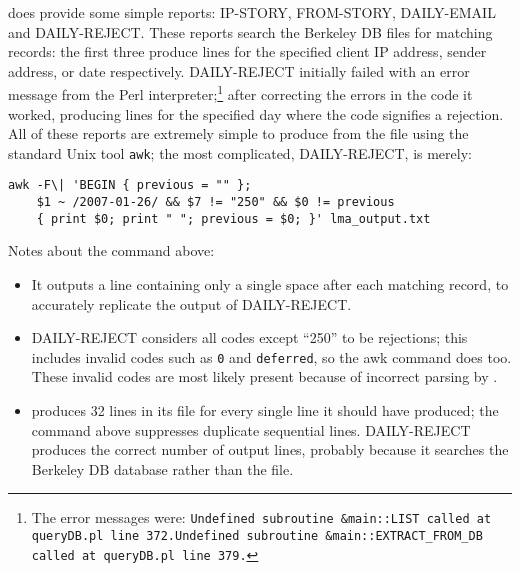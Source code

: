  does provide some simple reports: IP-STORY, FROM-STORY,
DAILY-EMAIL and DAILY-REJECT\@.  These reports search the Berkeley DB files
for matching records: the first three produce  lines for the
specified client IP address, sender address, or date respectively.
DAILY-REJECT initially failed with an error message from the Perl
interpreter;\footnote{The error messages were: \newline{}\texttt{Undefined
subroutine \&main::LIST called at queryDB.pl line
372.}\newline{}\texttt{Undefined subroutine \&main::EXTRACT\_FROM\_DB
called at queryDB.pl line 379.}} after correcting the errors in the code it
worked, producing  lines for the specified day where the
 code signifies a rejection.  All of these reports are
extremely simple to produce from the  file using the standard
Unix tool \texttt{awk}; the most complicated, DAILY-REJECT, is
merely:


\begin{verbatim}
awk -F\| 'BEGIN { previous = "" };
    $1 ~ /2007-01-26/ && $7 != "250" && $0 != previous
    { print $0; print " "; previous = $0; }' lma_output.txt
\end{verbatim}

Notes about the command above:

\begin{itemize}

    \item It outputs a line containing only a single space after each
        matching record, to accurately replicate the output of
        DAILY-REJECT\@.

    \item DAILY-REJECT considers all  codes except ``250'' to
        be rejections; this includes invalid  codes such as
        \texttt{0} and \texttt{deferred}, so the awk command does too.
        These invalid  codes are most likely present because
        of incorrect parsing by .

    \item {} produces 32 lines in its  file for
        every single line it should have produced; the command above
        suppresses duplicate sequential lines.  DAILY-REJECT produces the
        correct number of output lines, probably because it searches the
        Berkeley DB database rather than the  file.

\end{itemize}


